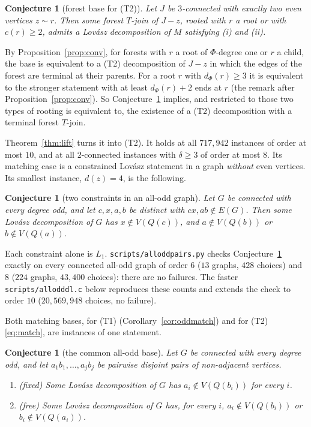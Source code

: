 \documentclass[11pt]{amsart}
\newtheorem{conjecture}[theorem]{Conjecture}
\theoremstyle{definition}
\theoremstyle{remark}
\renewcommand{\_}{\oldunderscore\allowbreak}
\begin{document}
\begin{conjecture}[forest base for (T2)]\label{conj:base}
Let $J$ be $3$-connected with exactly two even vertices $z\sim r$. Then some forest $T$-join of $J-z$,
rooted with $r$ a root or with $c(r)\ge2$, admits a Lov\'asz decomposition of $M$ satisfying (i) and
(ii).
\end{conjecture}

By Proposition~\ref{prop:conv}, for forests with $r$ a root of $\Phi$-degree one or $r$ a child,
the base is equivalent to a (T2) decomposition of $J-z$ in which the edges of the forest are
terminal at their parents. For a root $r$ with $d_\Phi(r)\ge3$ it is equivalent to the stronger
statement with at least $d_\Phi(r)+2$ ends at $r$ (the remark after Proposition~\ref{prop:conv}).
So Conjecture~\ref{conj:base} implies, and restricted to those two types of rooting is equivalent
to, the existence of a (T2) decomposition with a terminal forest $T$-join.

Theorem~\ref{thm:lift} turns it into (T2). It holds at all $717{,}942$ instances of order at most $10$,
and at all $2$-connected instances with $\delta\ge3$ of order at most $8$. Its matching case is a
constrained Lov\'asz statement in a graph \emph{without} even vertices. Its smallest instance,
$d(z)=4$, is the following.

\begin{conjecture}[two constraints in an all-odd graph]\label{conj:two}
Let $G$ be connected with every degree odd, and let $c,x,a,b$ be distinct with $cx,ab\notin E(G)$.
Then some Lov\'asz decomposition of $G$ has $x\notin V(Q(c))$, and $a\notin V(Q(b))$ or
$b\notin V(Q(a))$.
\end{conjecture}

Each constraint alone is $L_1$. \texttt{scripts/allodd\_pairs.py} checks Conjecture~\ref{conj:two}
exactly on every connected all-odd graph of order $6$ ($13$ graphs, $428$ choices) and $8$ ($224$
graphs, $43{,}400$ choices): there are no failures. The faster \texttt{scripts/allodd\_dl.c} below
reproduces these counts and extends the check to order $10$ ($20{,}569{,}948$ choices, no failure).

Both matching bases, for (T1) (Corollary~\ref{cor:oddmatch}) and for (T2) \eqref{eq:match}, are
instances of one statement.

\begin{conjecture}[the common all-odd base]\label{conj:common}
Let $G$ be connected with every degree odd, and let $a_1b_1,\dots,a_jb_j$ be pairwise disjoint pairs
of non-adjacent vertices.
\begin{enumerate}[label=(\alph*)]
\item (\emph{fixed}) Some Lov\'asz decomposition of $G$ has $a_i\notin V(Q(b_i))$ for every $i$.
\item (\emph{free}) Some Lov\'asz decomposition of $G$ has, for every $i$, $a_i\notin V(Q(b_i))$ or
$b_i\notin V(Q(a_i))$.
\end{enumerate}
\end{conjecture}
\end{document}
